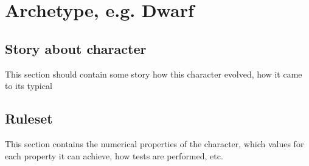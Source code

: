 \section{Archetype, e.g. Dwarf}
\subsection{Story about character}
This section should contain some story how this character evolved, how it came to its typical 
\subsection{Ruleset}
This section contains the numerical properties of the character, which values for each property it can achieve, how tests are performed, etc.
